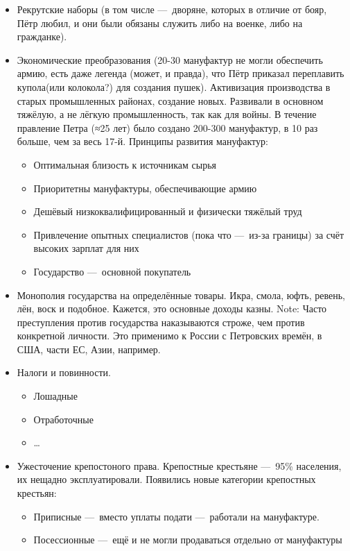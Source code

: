 \documentclass[12pt, a4paper]{article}
\begin{document}
\begin{itemize}
    \item Рекрутские наборы (в том числе — дворяне, которых в отличие от бояр, Пётр любил, и они были обязаны служить либо на военке, либо на гражданке).
    \item Экономические преобразования (20-30 мануфактур не могли обеспечить армию, есть даже легенда (может, и правда), что Пётр приказал переплавить купола(или колокола?) для создания пушек).
    Активизация производства в старых промышленных районах, создание новых. Развивали в основном тяжёлую, а не лёгкую промышленность, так как для войны. 
    В течение правление Петра (≈25 лет) было создано 200-300 мануфактур, в 10 раз больше, чем за весь 17-й. 
    Принципы развития мануфактур:
    \begin{itemize}
        \item Оптимальная близость к источникам сырья
        \item Приоритетны мануфактуры, обеспечивающие армию
        \item Дешёвый низкоквалифицированный и физически тяжёлый труд
        \item Привлечение опытных специалистов (пока что — из-за границы) за счёт высоких зарплат для них
        \item Государство — основной покупатель
    \end{itemize}
    \item Монополия государства на определённые товары. Икра, смола, юфть, ревень, лён, воск и подобное. Кажется, это основные доходы казны.
    Note: Часто преступления против государства наказываются строже, чем против конкретной личности. 
    Это применимо к России с Петровских времён, в США, части ЕС, Азии, например.
    
    \item Налоги и повинности.
    
    \begin{itemize}
        \item Лошадные
        \item Отработочные
        \item …
    \end{itemize}
    
    \item Ужесточение крепостоного права. Крепостные крестьяне — 95\% населения, их нещадно эксплуатировали. 
    Появились новые категории крепостных крестьян:
    \begin{itemize}
        \item Приписные — вместо уплаты подати — работали на мануфактуре.
        \item Посессионные — ещё и не могли продаваться отдельно от мануфактуры
    \end{itemize}
    

\end{itemize}
\end{document}

